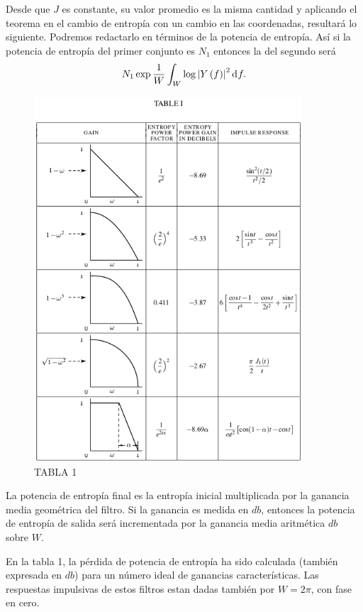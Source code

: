 Desde que $J$ es constante, su valor promedio es la misma cantidad y
aplicando el teorema en el cambio de entrop\'ia con un cambio en las
coordenadas, resultar\'a lo siguiente. Podremos redactarlo en
t\'erminos de la potencia de entrop\'ia. As\'i si la potencia de
entrop\'ia del primer conjunto es $N_{1}$ entonces la del segundo
ser\'a
\begin{equation}
N_{1}\exp \frac{1}{W}\int_{W}^{\:}\log \left | Y\left ( f \right )
\right |^{2} \diff f.
\end{equation}

\begin{figure}
\centerline{\includegraphics[width=100mm]{./Imagenes/Table1-Pagina40.png}}
\caption{TABLA 1}
\label{TABLA 1}
\end{figure}

La potencia de entrop\'ia final es la entrop\'ia inicial multiplicada
por la ganancia media geom\'etrica del filtro. Si la ganancia es
medida en $db$, entonces la potencia de entrop\'ia de salida ser\'a
incrementada por la ganancia media aritm\'etica $db$ sobre $W$.

En la tabla 1, la p\'erdida de potencia de entrop\'ia ha sido
calculada (tambi\'en expresada en $db$) para un n\'umero ideal de
ganancias caracter\'isticas. Las respuestas impulsivas de estos
filtros estan dadas tambi\'en por $W = 2 \pi$, con fase en cero.

